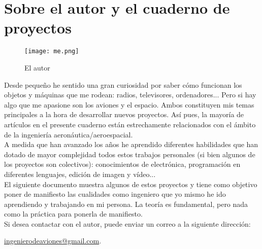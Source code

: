 \section*{Sobre el autor y el cuaderno de proyectos}

\begin{wrapfigure}{r}{0.4\linewidth}
	\centering
	\texttt{[image: me.png]}
	\caption*{El autor}
	\label{labelformat=empty}
\end{wrapfigure}

Desde pequeño he sentido una gran curiosidad por saber cómo funcionan los objetos y máquinas que me rodean: radios, televisores, ordenadores... Pero si hay algo que me apasione son los aviones y el espacio. Ambos constituyen mis temas principales a la hora de desarrollar nuevos proyectos. Así pues, la mayoría de artículos en el presente cuaderno están estrechamente relacionados con el ámbito de la ingeniería aeronáutica/aeroespacial.\\

A medida que han avanzado los años he aprendido diferentes habilidades que han dotado de mayor complejidad todos estos trabajos personales (si bien algunos de los proyectos son colectivos): conocimientos de electrónica, programación en diferentes lenguajes, edición de imagen y vídeo... \\

El siguiente documento muestra algunos de estos proyectos y tiene como objetivo poner de manifiesto las cualidades como ingeniero que yo mismo he ido aprendiendo y trabajando en mi persona. La teoría es fundamental, pero nada como la práctica para ponerla de manifiesto.\\

Si desea contactar con el autor, puede enviar un correo a la siguiente dirección:

\href{mailto:ingenierodeaviones@gmail.com}{ingenierodeaviones@gmail.com}.


